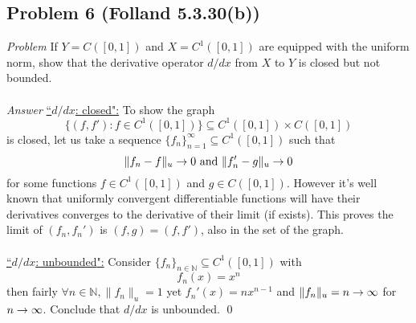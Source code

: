\documentclass[12pt,a4paper]{article}
\newcommand{\ra}[1]{\ifnum #1=1\rightarrow\fi\ifnum #1=2\Rightarrow\fi}
\newcommand{\claim}[1]{\underline{``{#1}":}}
\newcommand{\x}{\times}
\newcommand{\N}{\mathbb N}%
\begin{document}
\newpage\subsection*{Problem 6 (Folland 5.3.30(b))}
{\it Problem \; }If $Y = C([0,1])$ and $X = C^1([0,1])$ are equipped with the uniform norm, show that the derivative operator $d/dx$ from $X$ to $Y$ is closed but not bounded. \\
\\
{\it Answer \; } \claim{$d/dx$: closed} To show the graph
$$\{(f, f'): f \in C^1([0, 1])\} \subseteq C^1([0, 1]) \x C([0, 1])$$
is closed, let us take a sequence $\{f_n\}_{n=1}^\infty \subseteq C^1([0, 1])$ such that 
$$\|f_n - f\|_u \ra1 0 \text{ and } \|f_n' - g\|_u \ra1 0$$ for some functions $f\in C^1([0, 1])$ and $g \in C([0, 1])$. However it's well known that uniformly convergent differentiable functions will have their derivatives converges to the derivative of their limit (if exists). This proves the limit of $(f_n, f_n')$ is $(f, g) = (f, f')$, also in the set of the graph.\\
\\
\claim{$d/dx$: unbounded} Consider $\{f_n\}_{n\in\N} \subseteq C^1([0, 1])$ with
$$f_n(x) = x^n$$
then fairly $\forall n \in \N, \|f_n\|_u = 1$ yet $f_n'(x) = nx^{n-1}$ and $\|f_n\|_u = n \ra1 \infty$ for $n\ra1\infty$. Conclude that $d/dx$ is unbounded. \qed
\end{document}

